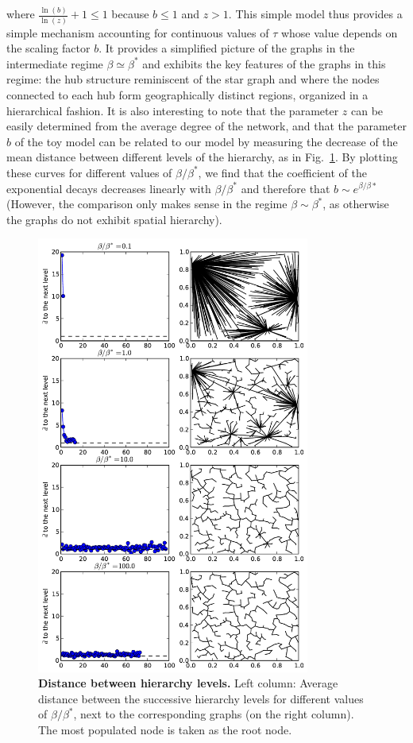 where $\frac{\ln(b)}{\ln(z)} +1 \leq 1$ because $b \leq 1$ and $z>1$. This
simple model thus provides a simple mechanism accounting for continuous values
of $\tau$ whose value depends on the scaling factor $b$. It provides a
simplified picture of the graphs in the intermediate regime $\beta \simeq
\beta^*$ and exhibits the key features of the graphs in this regime: the hub
structure reminiscent of the star graph and where the nodes connected to each
hub form geographically distinct regions, organized in a hierarchical fashion.
It is also interesting to note that the parameter $z$ can be easily determined
from the average degree of the network, and that the parameter $b$ of the toy
model can be related to our model by measuring the decrease of the mean distance
between different levels of the hierarchy, as in
Fig.~\ref{fig:distance_hierarchy}. By plotting these curves for different values
of $\beta/\beta^*$, we find that the coefficient of the exponential decays
decreases linearly with $\beta / \beta^*$ and therefore that $b \sim
e^{\beta/\beta*}$ (However, the comparison only makes sense in the regime $\beta
\sim \beta^*$, as otherwise the graphs do not exhibit spatial hierarchy).

\begin{figure}
    \centering
    \includegraphics[width=0.80\textwidth]{gfx/chapter-networks/figure5.pdf}
    \caption{{\bf Distance between hierarchy levels.} Left column: Average
    distance between the successive hierarchy levels for different values of
    $\beta/\beta^*$, next to the corresponding graphs (on the right column). The
    most populated node is taken as the root node. \label{fig:distance_hierarchy}}
\end{figure}




